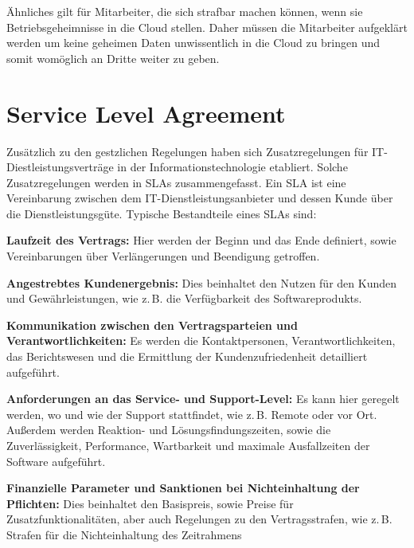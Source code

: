 \"Ahnliches gilt f\"ur Mitarbeiter, die sich strafbar machen k\"onnen, wenn sie Betriebsgeheimnisse in die Cloud stellen. Daher m\"ussen die Mitarbeiter aufgekl\"art werden um keine geheimen Daten unwissentlich in die Cloud zu bringen und somit wom\"oglich an Dritte weiter zu geben.

\section{Service Level Agreement}
Zus\"atzlich zu den gestzlichen Regelungen haben sich  Zusatzregelungen  f\"ur IT-Diestleistungsvertr\"age in der Informationstechnologie etabliert. Solche Zusatzregelungen werden in SLAs zusammengefasst.
Ein SLA ist eine Vereinbarung zwischen dem IT-Dienstleistungsanbieter und dessen Kunde \"uber die Dienstleistungsg\"ute.\newline
Typische Bestandteile eines SLAs sind:
\begin{seList}
\item \textbf{Laufzeit des Vertrags:}\newline
Hier werden der Beginn und das Ende definiert, sowie Vereinbarungen \"uber Verl\"angerungen und Beendigung getroffen.
\item \textbf{Angestrebtes Kundenergebnis:}\newline
Dies beinhaltet den Nutzen f\"ur den Kunden und Gew\"ahrleistungen, wie z.\,B. die Verf\"ugbarkeit des Softwareprodukts.
\item \textbf{Kommunikation zwischen den Vertragsparteien und Verantwortlichkeiten:}\newline	
Es werden die Kontaktpersonen, Verantwortlichkeiten, das Berichtswesen und die Ermittlung der Kundenzufriedenheit detailliert aufgef\"uhrt.
\item \textbf{Anforderungen an das Service- und Support-Level:}\newline	
Es kann hier geregelt werden, wo und wie der Support stattfindet, wie z.\,B. Remote oder vor Ort. Au{\ss}erdem werden Reaktion- und L\"osungsfindungszeiten, sowie die Zuverl\"assigkeit, Performance, Wartbarkeit und maximale Ausfallzeiten der Software aufgef\"uhrt.
\item \textbf{Finanzielle Parameter und Sanktionen bei Nichteinhaltung der Pflichten:}\newline	
Dies beinhaltet den Basispreis, sowie Preise f\"ur Zusatzfunktionalit\"aten, aber auch Regelungen zu den Vertragsstrafen, wie z.\,B. Strafen f\"ur die Nichteinhaltung des Zeitrahmens
\end{seList}

